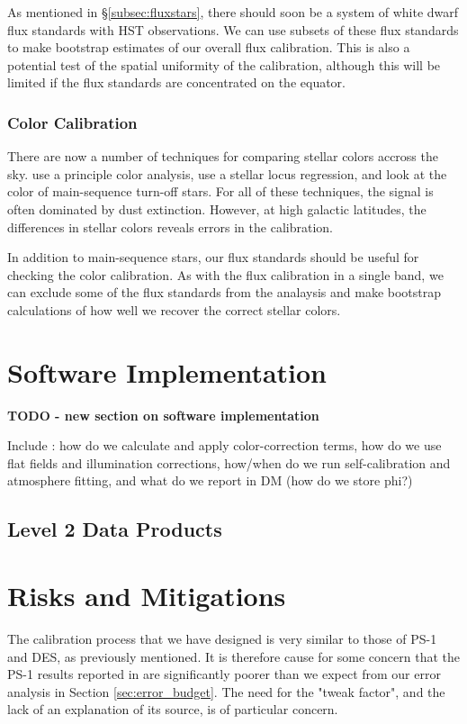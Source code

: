\documentclass[12pt,preprint]{aastex}
\begin{document}
As mentioned in \S\ref{subsec:fluxstars}, there should soon be a
system of white dwarf flux standards with HST observations.  We can
use subsets of these flux standards to make bootstrap estimates of our
overall flux calibration.  This is also a potential test of the
spatial uniformity of the calibration, although this will be limited
if the flux standards are concentrated on the equator.

\subsubsection{Color Calibration}

There are now a number of techniques for comparing stellar colors
accross the sky.  \citet{Ivezic04} use a principle color analysis,
\citet{High09} use a stellar locus regression, and \citet{Schlafly10}
look at the color of main-sequence turn-off stars.  For all of these
techniques, the signal is often dominated by dust extinction.
However, at high galactic latitudes, the differences in stellar colors
reveals errors in the calibration.  

In addition to main-sequence stars, our flux standards should be
useful for checking the color calibration.  As with the flux
calibration in a single band, we can exclude some of the flux
standards from the analaysis and make bootstrap calculations of how
well we recover the correct stellar colors.


\section{Software Implementation}
\label{sec:software}

{\bf TODO - new section on software implementation } 

Include : how do we calculate and apply color-correction terms, how do
we use flat fields and illumination corrections, how/when do we run
self-calibration and atmosphere fitting, and what do we report in DM
(how do we store phi?)
\subsection{Level 2 Data Products}

\section{Risks and Mitigations}

The calibration process that we have designed is very similar to those of PS-1 and DES, as previously mentioned.  It is therefore
cause for some concern that the PS-1 results reported in \citep{Tonry2012} are significantly poorer than we expect from our
error analysis in Section \ref{sec:error_budget}.  The need for the "tweak factor", and the lack of an explanation of its source, is of particular concern.
\end{document}
